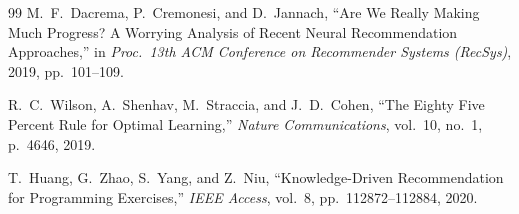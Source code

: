 \documentclass[12pt,a4paper]{article}
\begin{document}
\begin{thebibliography}{99}
M.~F.~Dacrema, P.~Cremonesi, and D.~Jannach, ``Are We Really Making Much Progress? A Worrying Analysis of Recent Neural Recommendation Approaches,'' in \emph{Proc.\ 13th ACM Conference on Recommender Systems (RecSys)}, 2019, pp.~101--109.

R.~C.~Wilson, A.~Shenhav, M.~Straccia, and J.~D.~Cohen, ``The Eighty Five Percent Rule for Optimal Learning,'' \emph{Nature Communications}, vol.~10, no.~1, p.~4646, 2019.

T.~Huang, G.~Zhao, S.~Yang, and Z.~Niu, ``Knowledge-Driven Recommendation for Programming Exercises,'' \emph{IEEE Access}, vol.~8, pp.~112872--112884, 2020.

\end{thebibliography}
\end{document}
